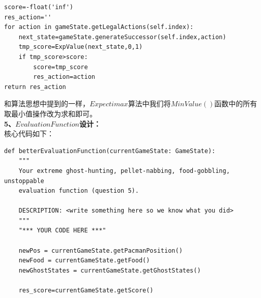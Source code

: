 \documentclass[a4paper,12pt,UTF8]{article}
\begin{document}
\begin{flushleft}
{{\begin{lstlisting}
score=-float('inf')
res_action=''
for action in gameState.getLegalActions(self.index):
    next_state=gameState.generateSuccessor(self.index,action)
    tmp_score=ExpValue(next_state,0,1)
    if tmp_score>score:
        score=tmp_score
        res_action=action
return res_action
        \end{lstlisting}
    }
    \normalsize{
        \hspace{1cm}和算法思想中提到的一样，$Expectimax$算法中我们将$MinValue()$函数中的所有取最小值操作改为求和即可。\\
    }
    \large{
        \hspace{1cm}\textbf{5、$Evaluation Function$设计：\\}
    }
    \normalsize{
        \hspace{1cm}核心代码如下：\\
    }
    \scriptsize{
        \begin{lstlisting}
def betterEvaluationFunction(currentGameState: GameState):
    """
    Your extreme ghost-hunting, pellet-nabbing, food-gobbling, unstoppable
    evaluation function (question 5).

    DESCRIPTION: <write something here so we know what you did>
    """
    "*** YOUR CODE HERE ***"

    newPos = currentGameState.getPacmanPosition()
    newFood = currentGameState.getFood()
    newGhostStates = currentGameState.getGhostStates()

    res_score=currentGameState.getScore()


\end{lstlisting}}}
\end{flushleft}
\end{document}

